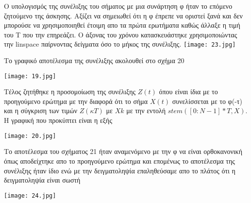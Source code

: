 \documentclass[11pt]{article}
\begin{document}
Ο υπολογισμός της συνέλιξης του σήματος με μια συνάρτηση φ ήταν το επόμενο ζητούμενο της άσκησης. Αξίζει να σημειωθεί ότι η φ έπρεπε να οριστεί ξανά και δεν μπορούσε να χρησιμοποιηθεί έτοιμη απο τα πρώτα ερωτήματα καθώς άλλαξε η τιμή του Τ που την επηρεάζει. Ο άξονας του χρόνου κατασκευάστηκε χρησιμοποιώντας την \foreignlanguage{english}{linspace} παίρνοντας δείγματα όσο το μήκος της συνέλιξης.
\hfill
\texttt{[image: 23.jpg]}

Το γραφικό αποτέλεσμα της συνέλιξης ακολουθεί στο σχήμα 20 

\texttt{[image: 19.jpg]}
\hfill

Τέλος ζητήθηκε η προσομοίωση της συνέλιξης $Z(t)$ όπου είναι ίδια με το προηγούμενο ερώτημα με την διαφορά ότι το σήμα $X(t)$ συνελίσσεται με το  φ(-τ) και η σύγκριση των τιμών $Ζ(κΤ)$ με $Xk$ με την εντολή $stem([0:N-1]*T,X)$. Η γραφική που προκύπτει είναι η εξής 

\texttt{[image: 20.jpg]}

Το αποτέλεσμα του σχήματος 21 ήταν αναμενόμενο με την φ να είναι ορθοκανονική όπως αποδείχτηκε απο το προηγούμενο ερώτημα και επομένως το αποτέλεσμα της συνέλιξης ήταν ίδιο ενώ με την δειγματοληψία επαληθεύσαμε απο το πλάτος ότι η δειγματοληψία είναι σωστή 

\texttt{[image: 24.jpg]}
\end{document}
